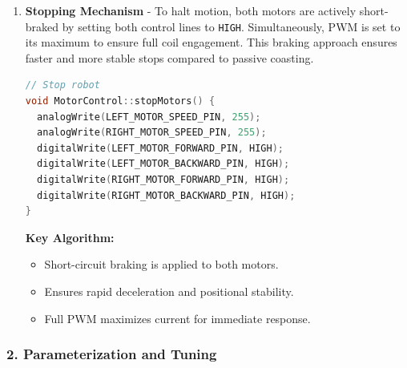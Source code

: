 \documentclass[conference]{IEEEtran}
\begin{document}
\begin{enumerate}[label=\alph*)]
\begin{lstlisting}[language=C++, caption=Counter-rotational in-place turning]
// Rotate robot to the left
void MotorControl::rotateLeft(int speed) {
  analogWrite(RIGHT_MOTOR_SPEED_PIN, speed);
  analogWrite(LEFT_MOTOR_SPEED_PIN, speed);
  digitalWrite(LEFT_MOTOR_FORWARD_PIN, LOW);
  digitalWrite(LEFT_MOTOR_BACKWARD_PIN, HIGH);
  digitalWrite(RIGHT_MOTOR_FORWARD_PIN, HIGH);
  digitalWrite(RIGHT_MOTOR_BACKWARD_PIN, LOW);
}

\end{lstlisting}

\textbf{Key Algorithm:}
\begin{itemize}
  \item Opposite motor directions produce a central rotation.
  \item Equal PWM ensures balanced torque and pivoting.
  \item Enables highly responsive directional changes.
\end{itemize}

\item \textbf{Stopping Mechanism} - To halt motion, both motors are actively short-braked by setting both control lines to \verb|HIGH|. Simultaneously, PWM is set to its maximum to ensure full coil engagement. This braking approach ensures faster and more stable stops compared to passive coasting.

\begin{lstlisting}[language=C++, caption=Active braking mechanism]
// Stop robot
void MotorControl::stopMotors() {
  analogWrite(LEFT_MOTOR_SPEED_PIN, 255);
  analogWrite(RIGHT_MOTOR_SPEED_PIN, 255);
  digitalWrite(LEFT_MOTOR_FORWARD_PIN, HIGH);
  digitalWrite(LEFT_MOTOR_BACKWARD_PIN, HIGH);
  digitalWrite(RIGHT_MOTOR_FORWARD_PIN, HIGH);
  digitalWrite(RIGHT_MOTOR_BACKWARD_PIN, HIGH);
}
\end{lstlisting}

\textbf{Key Algorithm:}
\begin{itemize}
  \item Short-circuit braking is applied to both motors.
  \item Ensures rapid deceleration and positional stability.
  \item Full PWM maximizes current for immediate response.
\end{itemize}
\end{enumerate}

\subsubsection*{\textbf{2. Parameterization and Tuning}}
\end{document}
